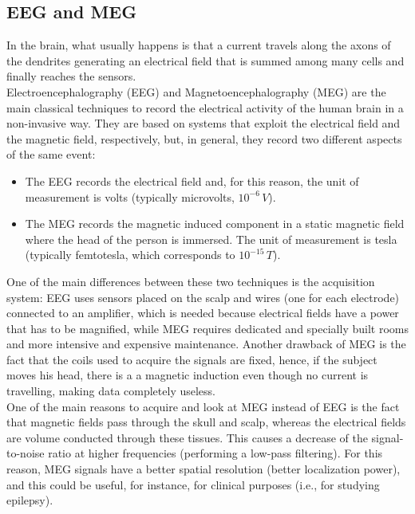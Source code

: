 \subsection{EEG and MEG}
In the brain, what usually happens is that a current travels along the axons of the dendrites generating an electrical 
field that is summed among many cells and finally reaches the sensors.\\
Electroencephalography (EEG) and Magnetoencephalography (MEG) are the main classical techniques to record the electrical activity of the human brain in a non-invasive way. They are based on systems 
that exploit the electrical field and the magnetic field, respectively, but, in general, they record two different aspects 
of the same event:
\begin{itemize}
    \item The EEG records the electrical field and, for this reason, the unit of measurement is volts (typically 
    microvolts, \(10^{-6}\,V\)).
    \item The MEG records the magnetic induced component in a static magnetic field where the head of the person is 
    immersed. The unit of measurement is tesla (typically femtotesla, which corresponds to \(10^{-15}\,T\)).
\end{itemize}
One of the main differences between these two techniques is the acquisition system: EEG 
uses sensors placed on the scalp and wires (one for each electrode) connected to an amplifier, which is needed because 
electrical fields have a power that has to be magnified, while MEG requires dedicated and specially built rooms and 
more intensive and expensive maintenance.
Another drawback of MEG is the fact that the coils used to acquire the signals are fixed, hence, if the subject moves his head, there is a 
a magnetic induction even though no current is travelling, making data completely useless.\\
One of the main reasons to acquire and look at MEG instead of EEG is the fact that magnetic fields pass through the 
skull and scalp, whereas the electrical fields are volume conducted through these tissues. This causes a decrease of the 
signal-to-noise ratio at higher frequencies (performing a low-pass filtering). For this reason, MEG signals have a 
better spatial resolution (better localization power), and this could be useful, for instance, 
for clinical purposes (i.e., for studying epilepsy).

